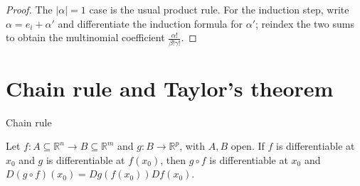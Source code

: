 \begin{proof}

The \(|\alpha| = 1\) case is the usual product rule. For the induction step, write \(\alpha = e_{i} + \alpha'\) and differentiate the induction formula for \(\alpha'\); reindex the two sums to obtain the multinomial coefficient \(\frac{\alpha!}{\beta!\gamma!}\).

\end{proof}

\section{Chain rule and Taylor's theorem}

\begin{theorem}{Chain rule}

Let \(f:A \subseteq \mathbb{R}^{n}\rightarrow B \subseteq \mathbb{R}^{m}\) and \(g:B\rightarrow\mathbb{R}^{p}\), with \(A,B\) open. If \(f\) is differentiable at \(x_{0}\) and \(g\) is differentiable at \(f\left( x_{0} \right)\), then \(g \circ f\) is differentiable at \(x_{0}\) and \(D\left( {g \circ f} \right)\left( x_{0} \right) = Dg\left( {f\left( x_{0} \right)} \right)Df\left( x_{0} \right)\).

\end{theorem}

